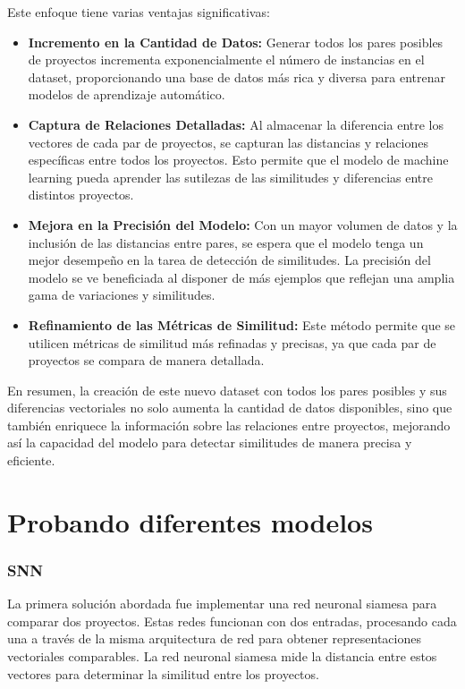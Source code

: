 Este enfoque tiene varias ventajas significativas:

\begin{itemize}
	\item {\bf Incremento en la Cantidad de Datos:} Generar todos los pares posibles de proyectos incrementa exponencialmente el número de instancias en el dataset, proporcionando una base de datos más rica y diversa para entrenar modelos de aprendizaje automático.

	\item {\bf Captura de Relaciones Detalladas:} Al almacenar la diferencia entre los vectores de cada par de proyectos, se capturan las distancias y relaciones específicas entre todos los proyectos. Esto permite que el modelo de machine learning pueda aprender las sutilezas de las similitudes y diferencias entre distintos proyectos.
	
	\item {\bf Mejora en la Precisión del Modelo:} Con un mayor volumen de datos y la inclusión de las distancias entre pares, se espera que el modelo tenga un mejor desempeño en la tarea de detección de similitudes. La precisión del modelo se ve beneficiada al disponer de más ejemplos que reflejan una amplia gama de variaciones y similitudes.
	
	\item {\bf Refinamiento de las Métricas de Similitud:} Este método permite que se utilicen métricas de similitud más refinadas y precisas, ya que cada par de proyectos se compara de manera detallada. 

\end{itemize}

En resumen, la creación de este nuevo dataset con todos los pares posibles y sus diferencias vectoriales no solo aumenta la cantidad de datos disponibles, sino que también enriquece la información sobre las relaciones entre proyectos, mejorando así la capacidad del modelo para detectar similitudes de manera precisa y eficiente.  

\section{Probando diferentes modelos}

\subsubsection{SNN}
La primera solución abordada fue implementar una red neuronal siamesa para comparar dos proyectos. Estas redes funcionan con dos entradas, procesando cada una a través de la misma arquitectura de red para obtener representaciones vectoriales comparables. La red neuronal siamesa mide la distancia entre estos vectores para determinar la similitud entre los proyectos.\\

